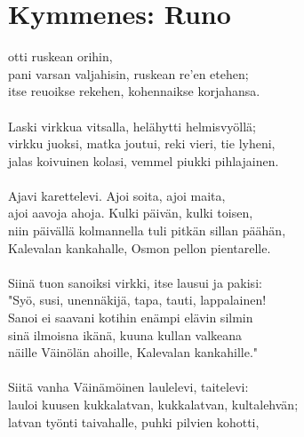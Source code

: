 
\chapter*{Kymmenes: Runo}

 otti ruskean orihin,          \\
pani varsan valjahisin, ruskean re'en etehen;                     \\
itse reuoikse rekehen, kohennaikse korjahansa.                    \\
                                                                  \\
Laski virkkua vitsalla, helähytti helmisvyöllä;                   \\
virkku juoksi, matka joutui, reki vieri, tie lyheni,              \\
jalas koivuinen kolasi, vemmel piukki pihlajainen.                \\
                                                                  \\
Ajavi karettelevi. Ajoi soita, ajoi maita,                        \\
ajoi aavoja ahoja. Kulki päivän, kulki toisen,                    \\
niin päivällä kolmannella tuli pitkän sillan päähän,              \\
Kalevalan kankahalle, Osmon pellon pientarelle.                   \\
                                                                  \\
Siinä tuon sanoiksi virkki, itse lausui ja pakisi:                \\
"Syö, susi, unennäkijä, tapa, tauti, lappalainen!                 \\
Sanoi ei saavani kotihin enämpi elävin silmin                     \\
sinä ilmoisna ikänä, kuuna kullan valkeana                        \\
näille Väinölän ahoille, Kalevalan kankahille."                   \\
                                                                  \\
Siitä vanha Väinämöinen laulelevi, taitelevi:                     \\
lauloi kuusen kukkalatvan, kukkalatvan, kultalehvän;              \\
latvan työnti taivahalle, puhki pilvien kohotti,                  \\
